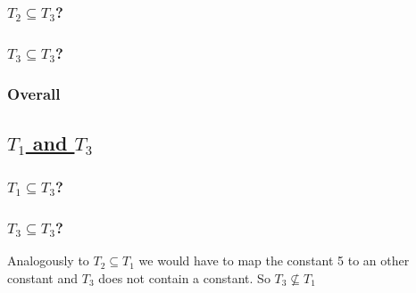 \documentclass[12pt]{article}
\begin{document}
	\subsubsection*{$T_2 \subseteq T_3$?} %
	\subsubsection*{$T_3 \subseteq T_3$?} %
%	
	\subsubsection*{Overall} %
	
	\subsection*{\underline{$T_1$ and $T_3$}}
	\subsubsection*{$T_1 \subseteq T_3$?}
	\subsubsection*{$T_3 \subseteq T_3$?}
	Analogously to $T_2 \subseteq T_1$ we would have to map the constant 5 to an other constant and $T_3$ does not contain a constant. So $T_3 \not \subseteq T_1$
\end{document}
